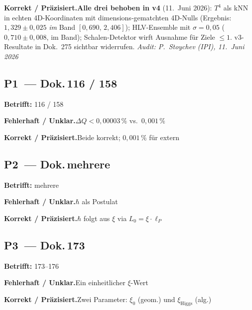 \smallskip\noindent\textbf{Korrekt / Präzisiert.}\quad \textbf{Alle drei behoben in v4} (11.~Juni 2026): $T^4$ als kNN in
  echten 4D-Koordinaten mit dimensions-gematchten 4D-Nulls (Ergebnis:
  $1{,}329\pm0{,}025$ \emph{im} Band $[0{,}690,\,2{,}406]$);
  HLV-Ensemble mit $\sigma=0{,}05$ ($0{,}710\pm0{,}008$, im Band);
  Schalen-Detektor wirft Ausnahme für Ziele $\leq1$.
  v3-Resultate in Dok.~275 sichtbar widerrufen.
  \emph{Audit: P.~Stoychev (IPI), 11.~Juni 2026}


\medskip


\subsection*{P1~--- Dok.\,116 / 158}

\noindent\textbf{Betrifft:} 116 / 158


\smallskip\noindent\textbf{Fehlerhaft / Unklar.}\quad $\Delta Q < 0{,}00003\,\%$ vs.\ $0{,}001\,\%$


\smallskip\noindent\textbf{Korrekt / Präzisiert.}\quad Beide korrekt; $0{,}001\,\%$ für extern


\medskip


\subsection*{P2~--- Dok.\,mehrere}

\noindent\textbf{Betrifft:} mehrere


\smallskip\noindent\textbf{Fehlerhaft / Unklar.}\quad $\hbar$ als Postulat


\smallskip\noindent\textbf{Korrekt / Präzisiert.}\quad $\hbar$ folgt aus $\xi$ via $L_0 = \xi\cdot\ell_P$


\medskip


\subsection*{P3~--- Dok.\,173}

\noindent\textbf{Betrifft:} 173--176


\smallskip\noindent\textbf{Fehlerhaft / Unklar.}\quad Ein einheitlicher $\xi$-Wert


\smallskip\noindent\textbf{Korrekt / Präzisiert.}\quad Zwei Parameter: $\xi_0$ (geom.) und $\xi_{\text{Higgs}}$ (alg.)



